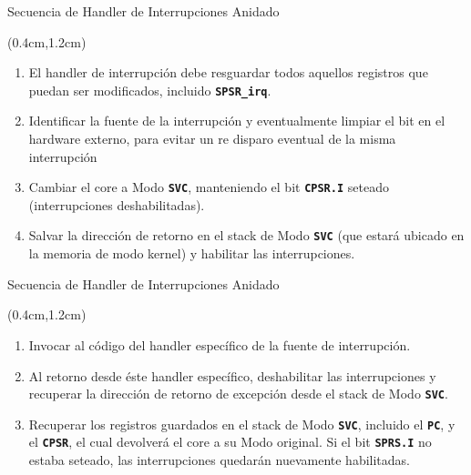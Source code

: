 \documentclass[usenames,table,xcolor={x11names},aspectratio=169]{beamer}
\newcounter{saveenumi}
\newcommand{\seti}{\setcounter{saveenumi}{\value{enumi}}}
\newcommand{\conti}{\setcounter{enumi}{\value{saveenumi}}}
\begin{document}
\begin{frame}[t]{Secuencia de Handler de Interrupciones Anidado}
 \begin{textblock*}{\textwidth}(0.4cm,1.2cm)
  \begin{enumerate}[<+(1)->]\justifying \parskip 0.3cm
   \item El handler de interrupción debe resguardar todos aquellos registros que puedan ser modificados, incluido \textbf{\texttt{SPSR\_irq}}.
   \item Identificar la fuente de la interrupción y eventualmente limpiar el bit en el hardware externo, para evitar un re disparo eventual de la misma interrupción
   \item Cambiar el core a Modo \texttt{\textbf{SVC}}, manteniendo el bit \textbf{\texttt{CPSR.I}} seteado (interrupciones deshabilitadas).
   \item Salvar la dirección de retorno en el stack de Modo \texttt{\textbf{SVC}} (que estará ubicado en la memoria de modo kernel) y habilitar las interrupciones.
   \seti
  \end{enumerate}
 \end{textblock*}
\end{frame}

\begin{frame}[t]{Secuencia de Handler de Interrupciones Anidado}
 \begin{textblock*}{\textwidth}(0.4cm,1.2cm)
  \begin{enumerate}[<+->] \justifying \parskip 0.3cm
   \conti
   \item Invocar al código del handler específico de la fuente de interrupción.
   \item Al retorno desde éste handler específico, deshabilitar las interrupciones y recuperar la dirección de retorno de excepción desde el stack de Modo \texttt{\textbf{SVC}}.
   \item Recuperar los registros guardados en el stack de Modo \texttt{\textbf{SVC}}, incluido el \textbf{\texttt{PC}}, y el \textbf{\texttt{CPSR}}, el cual devolverá el core a su Modo original. Si el bit \textbf{\texttt{SPRS.I}} no estaba seteado, las interrupciones quedarán nuevamente habilitadas.
  \end{enumerate}
 \end{textblock*}
\end{frame}
\end{document}
